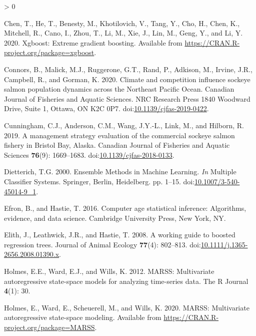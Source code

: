 \documentclass[
]{article}
\newlength{\cslhangindent}
\newenvironment{CSLReferences}[2] %
 {%
  \setlength{\parindent}{0pt}
  \ifodd #1 \everypar{\setlength{\hangindent}{\cslhangindent}}\ignorespaces\fi
  \ifnum #2 > 0
  \setlength{\parskip}{#2\baselineskip}
  \fi
 }%
 {}
\begin{document}
\begin{CSLReferences}{1}{0}
\leavevmode\hypertarget{ref-chen2020}{}%
Chen, T., He, T., Benesty, M., Khotilovich, V., Tang, Y., Cho, H., Chen, K., Mitchell, R., Cano, I., Zhou, T., Li, M., Xie, J., Lin, M., Geng, Y., and Li, Y. 2020. Xgboost: Extreme gradient boosting. Available from \url{https://CRAN.R-project.org/package=xgboost}.

\leavevmode\hypertarget{ref-connors2020}{}%
Connors, B., Malick, M.J., Ruggerone, G.T., Rand, P., Adkison, M., Irvine, J.R., Campbell, R., and Gorman, K. 2020. Climate and competition influence sockeye salmon population dynamics across the {Northeast Pacific Ocean}. Canadian Journal of Fisheries and Aquatic Sciences. {NRC Research Press 1840 Woodward Drive, Suite 1, Ottawa, ON K2C 0P7}. doi:\href{https://doi.org/10.1139/cjfas-2019-0422}{10.1139/cjfas-2019-0422}.

\leavevmode\hypertarget{ref-cunningham2019}{}%
Cunningham, C.J., Anderson, C.M., Wang, J.Y.-L., Link, M., and Hilborn, R. 2019. A management strategy evaluation of the commercial sockeye salmon fishery in {Bristol Bay}, {Alaska}. Canadian Journal of Fisheries and Aquatic Sciences \textbf{76}(9): 1669--1683. doi:\href{https://doi.org/10.1139/cjfas-2018-0133}{10.1139/cjfas-2018-0133}.

\leavevmode\hypertarget{ref-Dietterich2000}{}%
Dietterich, T.G. 2000. Ensemble {Methods} in {Machine Learning}. \emph{In} Multiple {Classifier Systems}. {Springer, Berlin, Heidelberg}. pp. 1--15. doi:\href{https://doi.org/10.1007/3-540-45014-9_1}{10.1007/3-540-45014-9\_1}.

\leavevmode\hypertarget{ref-efron2016}{}%
Efron, B., and Hastie, T. 2016. Computer age statistical inference: Algorithms, evidence, and data science. {Cambridge University Press}, {New York, NY}.

\leavevmode\hypertarget{ref-elith2008}{}%
Elith, J., Leathwick, J.R., and Hastie, T. 2008. A working guide to boosted regression trees. Journal of Animal Ecology \textbf{77}(4): 802--813. doi:\href{https://doi.org/10.1111/j.1365-2656.2008.01390.x}{10.1111/j.1365-2656.2008.01390.x}.

\leavevmode\hypertarget{ref-holmes2012}{}%
Holmes, E.E., Ward, E.J., and Wills, K. 2012. MARSS: Multivariate autoregressive state-space models for analyzing time-series data. The R Journal \textbf{4}(1): 30.

\leavevmode\hypertarget{ref-holmes2020}{}%
Holmes, E., Ward, E., Scheuerell, M., and Wills, K. 2020. MARSS: Multivariate autoregressive state-space modeling. Available from \url{https://CRAN.R-project.org/package=MARSS}.


\end{CSLReferences}
\end{document}
